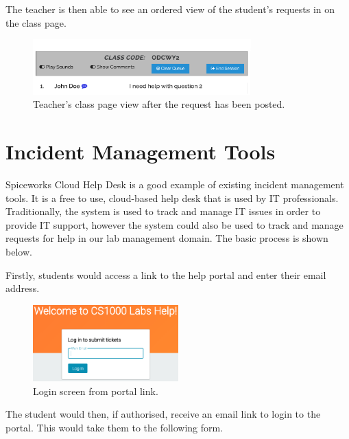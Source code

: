 The teacher is then able to see an ordered view of the student's requests in on the class page.

\FloatBarrier
\begin{figure}[H]
  \centering
  \includegraphics[width=0.75\textwidth]{2context/images/cq6.png}
  \caption{Teacher's class page view after the request has been posted.}
\end{figure}

\newpage
\section{Incident Management Tools}

Spiceworks Cloud Help Desk is a good example of existing incident management tools. It is a free to use, cloud-based help desk that is used by IT professionals. Traditionally, the system is used to track and manage IT issues in order to provide IT support, however the system could also be used to track and manage requests for help in our lab management domain. The basic process is shown below.

Firstly, students would access a link to the help portal and enter their email address.

\FloatBarrier
\begin{figure}[H]
  \centering
  \includegraphics[width=0.5\textwidth]{2context/images/SWportalLogin.png}
  \caption{Login screen from portal link.}
\end{figure}

The student would then, if authorised, receive an email link to login to the portal. This would take them to the following form.

